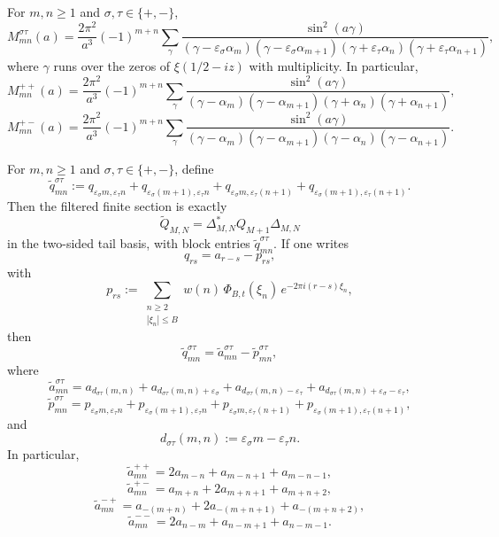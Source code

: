 \begin{corollary}\label{cor:H1-raw-gamma-blocks}
For $m,n\ge 1$ and $\sigma,\tau\in\{+,-\}$,
\[
  M_{mn}^{\sigma\tau}(a)
  =
  \frac{2\pi^2}{a^3}(-1)^{m+n}
  \sum_{\gamma}
  \frac{\sin^2(a\gamma)}
  {(\gamma-\varepsilon_\sigma\alpha_m)
   (\gamma-\varepsilon_\sigma\alpha_{m+1})
   (\gamma+\varepsilon_\tau\alpha_n)
   (\gamma+\varepsilon_\tau\alpha_{n+1})},
\]
where $\gamma$ runs over the zeros of $\xi(1/2-iz)$ with multiplicity.
In particular,
\[
  M_{mn}^{++}(a)
  =
  \frac{2\pi^2}{a^3}(-1)^{m+n}
  \sum_\gamma
  \frac{\sin^2(a\gamma)}
  {(\gamma-\alpha_m)(\gamma-\alpha_{m+1})(\gamma+\alpha_n)(\gamma+\alpha_{n+1})},
\]
\[
  M_{mn}^{+-}(a)
  =
  \frac{2\pi^2}{a^3}(-1)^{m+n}
  \sum_\gamma
  \frac{\sin^2(a\gamma)}
  {(\gamma-\alpha_m)(\gamma-\alpha_{m+1})(\gamma-\alpha_n)(\gamma-\alpha_{n+1})}.
\]
\end{corollary}

\begin{proposition}\label{prop:H1-filtered-q-blocks}
For $m,n\ge 1$ and $\sigma,\tau\in\{+,-\}$, define
\[
  \widetilde q_{mn}^{\sigma\tau}
  :=
  q_{\varepsilon_\sigma m,\varepsilon_\tau n}
  +
  q_{\varepsilon_\sigma(m+1),\varepsilon_\tau n}
  +
  q_{\varepsilon_\sigma m,\varepsilon_\tau(n+1)}
  +
  q_{\varepsilon_\sigma(m+1),\varepsilon_\tau(n+1)}.
\]
Then the filtered finite section is exactly
\[
  \widetilde Q_{M,N}=\Delta_{M,N}^*Q_{M+1}\Delta_{M,N}
\]
in the two-sided tail basis, with block entries
$\widetilde q_{mn}^{\sigma\tau}$.
If one writes
\[
  q_{rs}=a_{r-s}-p_{rs},
\]
with
\[
  p_{rs}
  :=
  \sum_{\substack{n\ge2\\ |\xi_n|\le B}}
  w(n)\,\Phi_{B,t}(\xi_n)\,e^{-2\pi i(r-s)\xi_n},
\]
then
\[
  \widetilde q_{mn}^{\sigma\tau}
  =
  \widetilde a_{mn}^{\sigma\tau}
  -
  \widetilde p_{mn}^{\sigma\tau},
\]
where
\[
  \widetilde a_{mn}^{\sigma\tau}
  =
  a_{d_{\sigma\tau}(m,n)}
  +
  a_{d_{\sigma\tau}(m,n)+\varepsilon_\sigma}
  +
  a_{d_{\sigma\tau}(m,n)-\varepsilon_\tau}
  +
  a_{d_{\sigma\tau}(m,n)+\varepsilon_\sigma-\varepsilon_\tau},
\]
\[
  \widetilde p_{mn}^{\sigma\tau}
  =
  p_{\varepsilon_\sigma m,\varepsilon_\tau n}
  +
  p_{\varepsilon_\sigma(m+1),\varepsilon_\tau n}
  +
  p_{\varepsilon_\sigma m,\varepsilon_\tau(n+1)}
  +
  p_{\varepsilon_\sigma(m+1),\varepsilon_\tau(n+1)},
\]
and
\[
  d_{\sigma\tau}(m,n):=\varepsilon_\sigma m-\varepsilon_\tau n.
\]
In particular,
\[
  \widetilde a_{mn}^{++}
  =
  2a_{m-n}+a_{m-n+1}+a_{m-n-1},
\]
\[
  \widetilde a_{mn}^{+-}
  =
  a_{m+n}+2a_{m+n+1}+a_{m+n+2},
\]
\[
  \widetilde a_{mn}^{-+}
  =
  a_{-(m+n)}+2a_{-(m+n+1)}+a_{-(m+n+2)},
\]
\[
  \widetilde a_{mn}^{--}
  =
  2a_{n-m}+a_{n-m+1}+a_{n-m-1}.
\]
\end{proposition}

